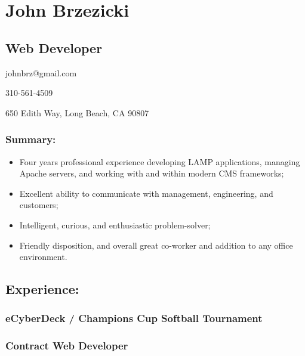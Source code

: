 \hypertarget{john-brzezicki}{%
\section{John Brzezicki}\label{john-brzezicki}}

\hypertarget{web-developer}{%
\subsection{Web Developer}\label{web-developer}}

johnbrz@gmail.com

310-561-4509

650 Edith Way, Long Beach, CA 90807

\hypertarget{summary}{%
\subsubsection{Summary:}\label{summary}}

\begin{itemize}
\tightlist
\item
  Four years professional experience developing LAMP applications,
  managing Apache servers, and working with and within modern CMS
  frameworks;
\item
  Excellent ability to communicate with management, engineering, and
  customers;
\item
  Intelligent, curious, and enthusiastic problem-solver;
\item
  Friendly disposition, and overall great co-worker and addition to any
  office environment.
\end{itemize}

\hypertarget{experience}{%
\subsection{Experience:}\label{experience}}

\hypertarget{ecyberdeck-champions-cup-softball-tournament}{%
\subsubsection{eCyberDeck / Champions Cup Softball
Tournament}\label{ecyberdeck-champions-cup-softball-tournament}}

\hypertarget{contract-web-developer}{%
\subsubsection{Contract Web Developer}\label{contract-web-developer}}

